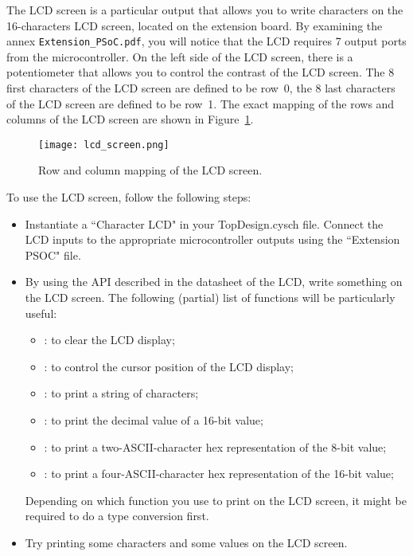 The LCD screen is a particular output that allows you to write characters on the 16-characters LCD screen, located on the extension board. By examining the annex \texttt{Extension\_PSoC.pdf}, you will notice that the LCD requires 7 output ports from the microcontroller. On the left side of the LCD screen, there is a potentiometer that allows you to control the contrast of the LCD screen. The 8 first characters of the LCD screen are defined to be row~0, the 8 last characters of the LCD screen are defined to be row~1. The exact mapping of the rows and columns of the LCD screen are shown in Figure~\ref{fig:lcd_screen}. 
\begin{figure}[h]
	\centering
	\texttt{[image: lcd\_screen.png]}
	\caption{Row and column mapping of the LCD screen. }
	\label{fig:lcd_screen}
\end{figure}
To use the LCD screen, follow the following steps: 
\begin{itemize}
	\item Instantiate a ``Character LCD" in your TopDesign.cysch file. Connect the LCD inputs to the appropriate microcontroller outputs using the ``Extension PSOC" file. 
	\item By using the API described in the datasheet of the LCD, write something on the LCD screen. The following (partial) list of functions will be particularly useful: 
	\begin{itemize}
		\item {}: to clear the LCD display; 
		\item {}: to control the cursor position of the LCD display; 
		\item {}: to print a string of characters; 
		\item {}: to print the decimal value of a 16-bit value; 
		\item {}: to print a two-ASCII-character hex representation of the 8-bit value; 
		\item {}: to print a four-ASCII-character hex representation of the 16-bit value; 
	\end{itemize}
	Depending on which function you use to print on the LCD screen, it might be required to do a type conversion first. 
	\item Try printing some characters and some values on the LCD screen. 
\end{itemize}






